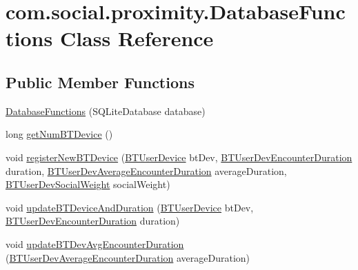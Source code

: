 \hypertarget{classcom_1_1social_1_1proximity_1_1_database_functions}{}\section{com.\+social.\+proximity.\+Database\+Functions Class Reference}
\label{classcom_1_1social_1_1proximity_1_1_database_functions}
\subsection*{Public Member Functions}
\begin{DoxyCompactItemize}
\item 
\hyperlink{classcom_1_1social_1_1proximity_1_1_database_functions_ad9923ea46c9cad358faf955ec624361e}{Database\+Functions} (S\+Q\+Lite\+Database database)
\item 
long \hyperlink{classcom_1_1social_1_1proximity_1_1_database_functions_a2e880b0dafb20139937f18a5e90b3649}{get\+Num\+B\+T\+Device} ()
\item 
void \hyperlink{classcom_1_1social_1_1proximity_1_1_database_functions_a525dc9e96941587a650435b01b1e14b2}{register\+New\+B\+T\+Device} (\hyperlink{classcom_1_1social_1_1proximity_1_1_b_t_user_device}{B\+T\+User\+Device} bt\+Dev, \hyperlink{classcom_1_1social_1_1proximity_1_1_b_t_user_dev_encounter_duration}{B\+T\+User\+Dev\+Encounter\+Duration} duration, \hyperlink{classcom_1_1social_1_1proximity_1_1_b_t_user_dev_average_encounter_duration}{B\+T\+User\+Dev\+Average\+Encounter\+Duration} average\+Duration, \hyperlink{classcom_1_1social_1_1proximity_1_1_b_t_user_dev_social_weight}{B\+T\+User\+Dev\+Social\+Weight} social\+Weight)
\item 
void \hyperlink{classcom_1_1social_1_1proximity_1_1_database_functions_afa77844cfc5644e5daae5ad713d2c11c}{update\+B\+T\+Device\+And\+Duration} (\hyperlink{classcom_1_1social_1_1proximity_1_1_b_t_user_device}{B\+T\+User\+Device} bt\+Dev, \hyperlink{classcom_1_1social_1_1proximity_1_1_b_t_user_dev_encounter_duration}{B\+T\+User\+Dev\+Encounter\+Duration} duration)
\item 
void \hyperlink{classcom_1_1social_1_1proximity_1_1_database_functions_a2ab63e9a49b88ef8549905b50c26e8e7}{update\+B\+T\+Dev\+Avg\+Encounter\+Duration} (\hyperlink{classcom_1_1social_1_1proximity_1_1_b_t_user_dev_average_encounter_duration}{B\+T\+User\+Dev\+Average\+Encounter\+Duration} average\+Duration)
\item 

\end{DoxyCompactItemize}
